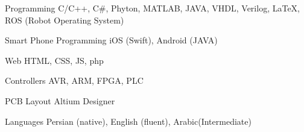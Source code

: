 

\begin{cvskills}

  \cvskill
    {Programming} %
    {C/C++, C\#, Phyton, MATLAB, JAVA, VHDL, Verilog, LaTeX, ROS (Robot Operating System)} %


  \cvskill
    {Smart Phone Programming} %
    {iOS (Swift), Android (JAVA)} %

  \cvskill
    {Web} %
    {HTML, CSS, JS, php} %

  \cvskill
    {Controllers} %
    {AVR, ARM, FPGA, PLC} %

  \cvskill
    {PCB Layout} %
    {Altium Designer} %

  \cvskill
    {Languages} %
    {Persian (native), English (fluent), Arabic(Intermediate)} %

\end{cvskills}
